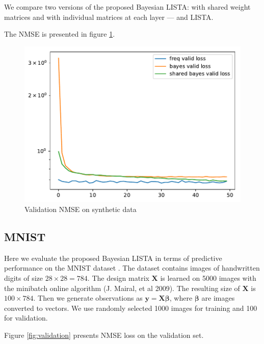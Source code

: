 \documentclass[letterpaper]{article}
\begin{document}
We compare two versions of the proposed Bayesian LISTA: with shared weight matrices and with individual matrices at each layer --- and LISTA.

The NMSE is presented in figure \ref{fig:validation_synthetic}.
\begin{figure}[t]
\includegraphics[width=\columnwidth]{loss_synthetic}
\caption{Validation NMSE on synthetic data}
\label{fig:validation_synthetic}
\end{figure}

\subsection{MNIST}
Here we evaluate the proposed Bayesian LISTA in terms of predictive performance on the MNIST dataset \cite{lecun2010mnist}. The dataset contains images of handwritten digits of size $28 \times 28 = 784$. The design matrix $\mathbf{X}$ is learned on 5000 images with the minibatch online algorithm (J. Mairal, et al 2009). The resulting size of $\mathbf{X}$ is $100 \times 784$. Then we generate observations as $\mathbf{y} = \mathbf{X}\boldsymbol\beta$, where $\boldsymbol\beta$ are images converted to vectors. We use randomly selected 1000 images for training and 100 for validation. 

Figure \ref{fig:validation} presents NMSE loss on the validation set. 
\end{document}

